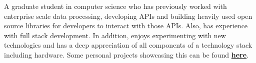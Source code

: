 
\begin{cvparagraph}
A graduate student in computer science who has previously worked with enterprise scale data processing, developing APIs and building heavily used open source libraries for developers to interact with those APIs. Also, has experience with full stack development. In addition, enjoys experimenting with new technologies and has a deep appreciation of all components of a technology stack including hardware. Some personal projects showcasing this can be found \href{https://sujaygarlanka.com/projects.html}{\textbf{here}}.
\end{cvparagraph}
